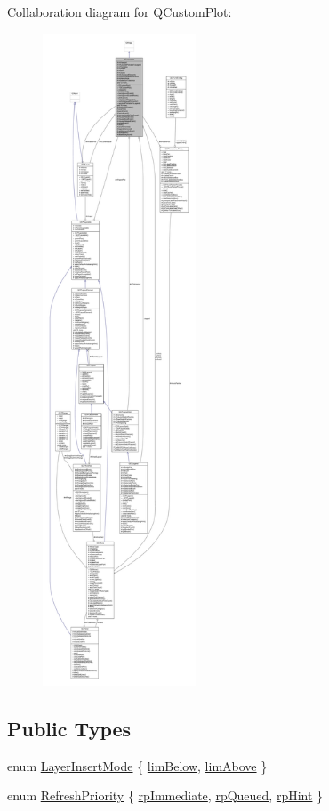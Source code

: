 Collaboration diagram for Q\+Custom\+Plot\+:\nopagebreak
\begin{figure}[H]
\begin{center}
\leavevmode
\includegraphics[height=550pt]{class_q_custom_plot__coll__graph}
\end{center}
\end{figure}
\subsection*{Public Types}
\begin{DoxyCompactItemize}
\item 
enum \hyperlink{class_q_custom_plot_a75a8afbe6ef333b1f3d47abb25b9add7}{Layer\+Insert\+Mode} \{ \hyperlink{class_q_custom_plot_a75a8afbe6ef333b1f3d47abb25b9add7aee39cf650cd24e68552da0b697ce4a93}{lim\+Below}, 
\hyperlink{class_q_custom_plot_a75a8afbe6ef333b1f3d47abb25b9add7a062b0b7825650b432a713c0df6742d41}{lim\+Above}
 \}
\item 
enum \hyperlink{class_q_custom_plot_a45d61392d13042e712a956d27762aa39}{Refresh\+Priority} \{ \hyperlink{class_q_custom_plot_a45d61392d13042e712a956d27762aa39a0d4831572370d871f2b7cb88806bac59}{rp\+Immediate}, 
\hyperlink{class_q_custom_plot_a45d61392d13042e712a956d27762aa39aaaae083a19bc668597bf0f86e000f798}{rp\+Queued}, 
\hyperlink{class_q_custom_plot_a45d61392d13042e712a956d27762aa39adfa1f2387617168d9299f4c8ad15b332}{rp\+Hint}
 \}
\end{DoxyCompactItemize}
